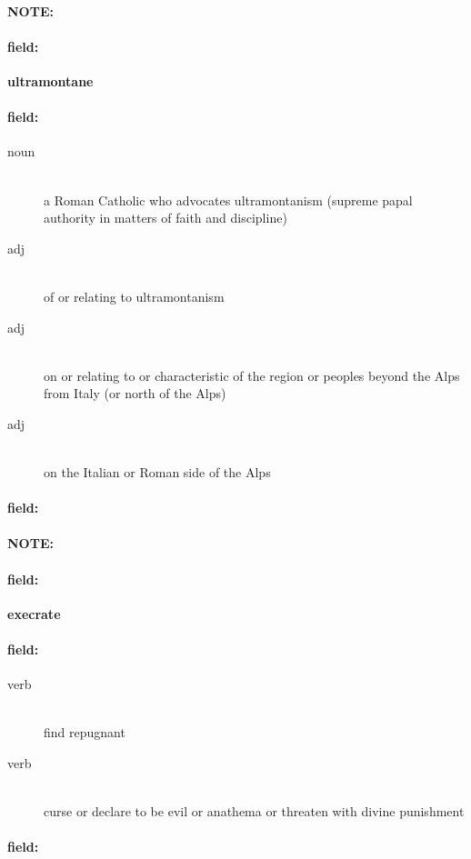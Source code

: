 \documentclass[12pt]{article}
\newenvironment{note}{\paragraph{NOTE:}}{}
\newenvironment{field}{\paragraph{field:}}{}
\begin{document}
\begin{note}
\begin{field}
\textbf{\large ultramontane}
\end{field}


\begin{field}
\begin{description}
\item[noun] \hfill \\ 
a Roman Catholic who advocates ultramontanism (supreme papal authority in matters of faith and discipline)

\item[adj] \hfill \\ 
of or relating to ultramontanism

\item[adj] \hfill \\ 
on or relating to or characteristic of the region or peoples beyond the Alps from Italy (or north of the Alps)

\item[adj] \hfill \\ 
on the Italian or Roman side of the Alps

\end{description}
\end{field}

\begin{field}
\end{field}
\end{note}
\begin{note}
\begin{field}
\textbf{\large execrate}
\end{field}


\begin{field}
\begin{description}
\item[verb] \hfill \\ 
find repugnant

\item[verb] \hfill \\ 
curse or declare to be evil or anathema or threaten with divine punishment

\end{description}
\end{field}

\begin{field}
\end{field}
\end{note}
\end{document}
